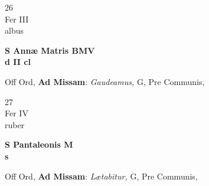 \documentclass[10pt, openany]{book}
\begin{document}
        \begin{center}
            \begin{minipage}{3.5in}
                \vspace{2em}
                \begin{minipage}{0.5in}
                    {\Huge 26} \\
                    {\normalsize Fer III} \\
                    {\normalsize albus}
                \end{minipage}
                \begin{minipage}{3.0in}
                    \textbf{ \large S Annæ Matris BMV \\
                    \textnormal{\normalsize d II cl}} \\ 
                \end{minipage}
                \begin{justify}Off Ord, \textbf{Ad Missam}: \textit{Gaudeamus,} G, Pre Communis,   
                \end{justify}
            \end{minipage}
        \end{center}
    
        \begin{center}
            \begin{minipage}{3.5in}
                \vspace{2em}
                \begin{minipage}{0.5in}
                    {\Huge 27} \\
                    {\normalsize Fer IV} \\
                    {\normalsize ruber}
                \end{minipage}
                \begin{minipage}{3.0in}
                    \textbf{ \large S Pantaleonis M \\
                    \textnormal{\normalsize s}} \\ 
                \end{minipage}
                \begin{justify}Off Ord, \textbf{Ad Missam}: \textit{Lætabitur,} G, Pre Communis,   
                \end{justify}
            \end{minipage}
        \end{center}
    
\end{document}
